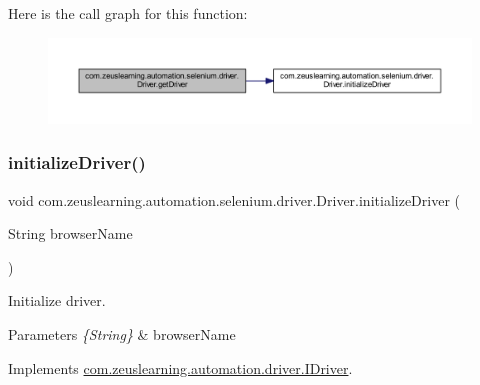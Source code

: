 Here is the call graph for this function\+:\nopagebreak
\begin{figure}[H]
\begin{center}
\leavevmode
\includegraphics[width=350pt]{d7/dcc/classcom_1_1zeuslearning_1_1automation_1_1selenium_1_1driver_1_1Driver_acf213a93d95506c1aa26b4e1b4154183_cgraph}
\end{center}
\end{figure}
\hypertarget{classcom_1_1zeuslearning_1_1automation_1_1selenium_1_1driver_1_1Driver_a5a80edeb2ead34ac5d92f331a1f59388}{}\label{classcom_1_1zeuslearning_1_1automation_1_1selenium_1_1driver_1_1Driver_a5a80edeb2ead34ac5d92f331a1f59388} 
\subsubsection{\texorpdfstring{initialize\+Driver()}{initializeDriver()}}
{\footnotesize\ttfamily void com.\+zeuslearning.\+automation.\+selenium.\+driver.\+Driver.\+initialize\+Driver (\begin{DoxyParamCaption}\item[{String}]{browser\+Name }\end{DoxyParamCaption})\hspace{0.3cm}{\ttfamily [inline]}}

Initialize driver.


\begin{DoxyParams}{Parameters}
{\em \{\+String\}} & browser\+Name \\
\hline
\end{DoxyParams}


Implements \hyperlink{interfacecom_1_1zeuslearning_1_1automation_1_1driver_1_1IDriver_a5662e9a248835364fcd27b0df392c3ea}{com.\+zeuslearning.\+automation.\+driver.\+I\+Driver}.

